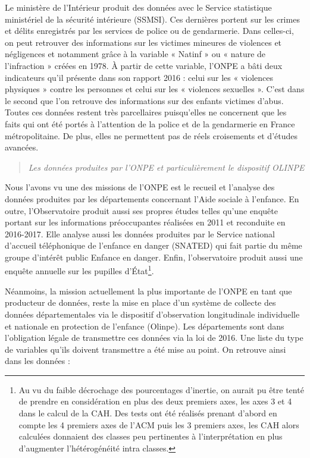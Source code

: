 \documentclass[
  12,
  a4paper,
]{report}
\begin{document}
Le ministère de l'Intérieur produit des données avec le Service
statistique ministériel de la sécurité intérieure (SSMSI). Ces dernières
portent sur les crimes et délits enregistrés par les services de police
ou de gendarmerie. Dans celles-ci, on peut retrouver des informations
sur les victimes mineures de violences et négligences et notamment grâce
à la variable « Natinf » ou « nature de l'infraction » créées en 1978. À
partir de cette variable, l'ONPE a bâti deux indicateurs qu'il présente
dans son rapport 2016 : celui sur les « violences physiques » contre les
personnes et celui sur les « violences sexuelles ». C'est dans le second
que l'on retrouve des informations sur des enfants victimes d'abus.
Toutes ces données restent très parcellaires puisqu'elles ne concernent
que les faits qui ont été portés à l'attention de la police et de la
gendarmerie en France métropolitaine. De plus, elles ne permettent pas
de réels croisements et d'études avancées.

\begin{quote}
\emph{Les données produites par l'ONPE et particulièrement le dispositif
OLINPE}
\end{quote}

Nous l'avons vu une des missions de l'ONPE est le recueil et l'analyse
des données produites par les départements concernant l'Aide sociale à
l'enfance. En outre, l'Observatoire produit aussi ses propres études
telles qu'une enquête portant sur les informations préoccupantes
réalisées en 2011 et reconduite en 2016-2017. Elle analyse aussi les
données produites par le Service national d'accueil téléphonique de
l'enfance en danger (SNATED) qui fait partie du même groupe d'intérêt
public Enfance en danger. Enfin, l'observatoire produit aussi une
enquête annuelle sur les pupilles d'État\footnote{Au vu du faible
  décrochage des pourcentages d'inertie, on aurait pu être tenté de
  prendre en considération en plus des deux premiers axes, les axes 3 et
  4 dans le calcul de la CAH. Des tests ont été réalisés prenant d'abord
  en compte les 4 premiers axes de l'ACM puis les 3 premiers axes, les
  CAH alors calculées donnaient des classes peu pertinentes à
  l'interprétation en plus d'augmenter l'hétérogénéité intra classes.}.

Néanmoins, la mission actuellement la plus importante de l'ONPE en tant
que producteur de données, reste la mise en place d'un système de
collecte des données départementales via le dispositif d'observation
longitudinale individuelle et nationale en protection de l'enfance
(Olinpe). Les départements sont dans l'obligation légale de transmettre
ces données via la loi de 2016. Une liste du type de variables qu'ils
doivent transmettre a été mise au point. On retrouve ainsi dans les
données :
\end{document}
